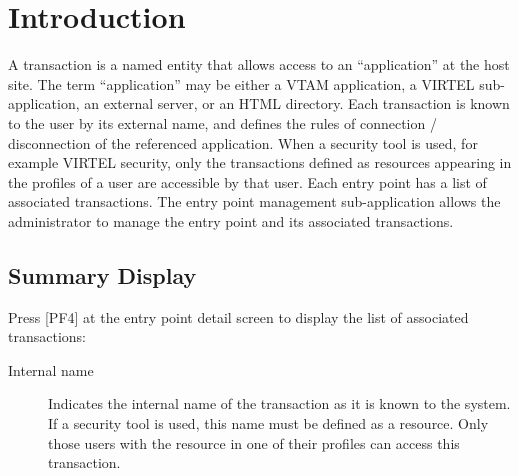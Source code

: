 \documentclass[letterpaper,10pt,english]{sphinxmanual}
\begin{document}
\section{Introduction}
\label{\detokenize{connectivity_guide:id61}}
A transaction is a named entity that allows access to an “application” at the host site. The term “application” may be either a VTAM application, a VIRTEL sub-application, an external server, or an HTML directory. Each transaction is known to the user by its external name, and defines the rules of connection / disconnection of the referenced application. When a security tool is used, for example VIRTEL security, only the transactions defined as resources appearing in the profiles of a user are accessible by that user. Each entry point has a list of associated transactions. The entry point management sub-application allows the administrator to manage the entry point and its associated transactions.

\ignorespaces 

\subsection{Summary Display}
\label{\detokenize{connectivity_guide:index-113}}\label{\detokenize{connectivity_guide:id62}}
Press {[}PF4{]} at the entry point detail screen to display the list of associated transactions:


\begin{description}
\item[{Internal name}] \leavevmode
Indicates the internal name of the transaction as it is known to the system. If a security tool is used, this name must be defined as a resource. Only those users with the resource in one of their profiles can access this transaction.

\end{description}
\end{document}
